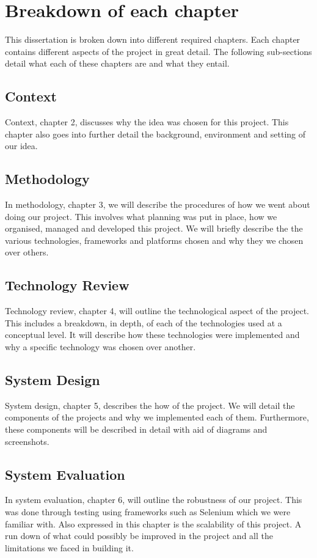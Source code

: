 \section{Breakdown of each chapter}
This dissertation is broken down into different required chapters. Each chapter contains different aspects of the project in great detail. The following sub-sections detail what each of these chapters are and what they entail.

\subsection{Context}
Context, chapter 2, discusses why the idea was chosen for this project. This chapter also goes into further detail the background, environment and setting of our idea.

\subsection{Methodology}
In methodology, chapter 3, we will describe the procedures of how we went about doing our project. This involves what planning was put in place, how we organised, managed and developed this project. We will briefly describe the the various technologies, frameworks and platforms chosen and why they we chosen over others.

\subsection{Technology Review}
Technology review, chapter 4, will outline the technological aspect of the project. This includes a breakdown, in depth, of each of the technologies used at a conceptual level. It will describe how these technologies were implemented and why a specific technology was chosen over another.

\subsection{System Design}
System design, chapter 5, describes the how of the project. We will detail the components of the projects and why we implemented each of them. Furthermore, these components will be described in detail with aid of diagrams and screenshots.

\subsection{System Evaluation}
In system evaluation, chapter 6, will outline the robustness of our project. This was done through testing using frameworks such as Selenium which we were familiar with. Also expressed in this chapter is the scalability of this project. A run down of what could possibly be improved in the project and all the limitations we faced in building it.


